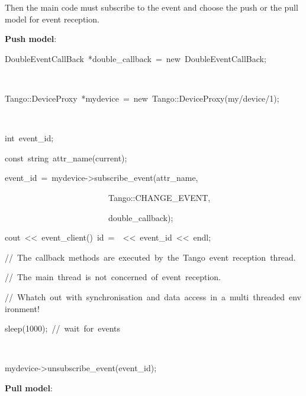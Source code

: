 Then the main code must subscribe to the event
and choose the push or the pull model for event reception.

\textbf{Push model}:


\begin{lyxcode}
DoubleEventCallBack~{*}double\_callback~=~new~DoubleEventCallBack;~

~~~~~~

Tango::DeviceProxy~{*}mydevice~=~new~Tango::DeviceProxy(\textquotedbl{}my/device/1\textquotedbl{});

~

int~event\_id;

const~string~attr\_name(\textquotedbl{}current\textquotedbl{});

event\_id~=~mydevice->subscribe\_event(attr\_name,~

~~~~~~~~~~~~~~~~~~~~~~~~~Tango::CHANGE\_EVENT,

~~~~~~~~~~~~~~~~~~~~~~~~~double\_callback);

cout~<\textcompwordmark{}<~\textquotedbl{}event\_client()~id~=~\textquotedbl{}~<\textcompwordmark{}<~event\_id~<\textcompwordmark{}<~endl;

//~The~callback~methods~are~executed~by~the~Tango~event~reception~thread.

//~The~main~thread~is~not~concerned~of~event~reception.

//~Whatch~out~with~synchronisation~and~data~access~in~a~multi~threaded~environment!

sleep(1000);~//~wait~for~events

~

mydevice->unsubscribe\_event(event\_id);
\end{lyxcode}


\textbf{Pull model}:

